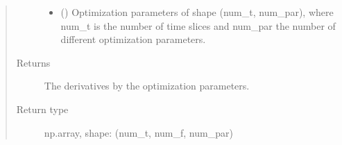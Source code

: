 \documentclass[letterpaper,10pt,english]{sphinxmanual}
\begin{document}
\begin{fulllineitems}
\begin{fulllineitems}
\begin{quote}
\begin{description}
\begin{itemize}
\item {} 
 () \textendash{} Optimization parameters of shape (num\_t, num\_par), where num\_t is
the number of time slices and num\_par the number of different
optimization parameters.

\end{itemize}

\item[{Returns}] \leavevmode
{} \textendash{} The derivatives by the optimization parameters.

\item[{Return type}] \leavevmode
np.array, shape: (num\_t, num\_f, num\_par)

\end{description}\end{quote}

\end{fulllineitems}


\end{fulllineitems}

\end{document}
